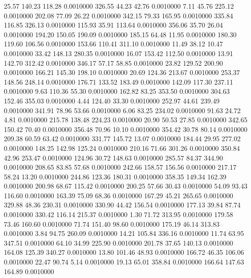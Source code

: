   25.57  140.23  118.28   0.0010000
 326.55   44.23   42.76   0.0010000
   7.11   45.76  225.12   0.0010000
 202.08   77.09   26.22   0.0010000
 342.15   79.33  165.95   0.0010000
 335.84  116.85  326.13   0.0010000
 115.93   35.91  113.64   0.0010000
 356.06   35.70   26.04   0.0010000
 194.20  150.05  190.09   0.0010000
 185.15   64.48   11.95   0.0010000
 180.30  119.60  106.56   0.0010000
 153.66  110.41  311.10   0.0010000
  11.49   38.12   10.47   0.0010000
  33.42  148.13  280.35   0.0010000
  16.07  153.42  112.50   0.0010000
  13.91  142.70  312.42   0.0010000
 346.17   57.17   58.85   0.0010000
  23.82  129.52  200.90   0.0010000
 166.21  145.30  198.10   0.0010000
  20.69  124.36  213.67   0.0010000
 253.37  148.56  248.14   0.0010000
 176.71  133.52  183.49   0.0010000
 142.09  117.30  237.11   0.0010000
   9.63  110.36   55.30   0.0010000
 162.82   83.25  353.50   0.0010000
 304.63  152.46  355.03   0.0010000
   4.44  124.40   33.30   0.0010000
 252.97   44.61  239.49   0.0010000
 341.91   78.96   53.66   0.0010000
   6.06   83.25  234.02   0.0010000
  91.63   24.72    4.81   0.0010000
 215.78  138.48  224.23   0.0010000
  20.90   50.53   27.85   0.0010000
 342.65  150.42   70.40   0.0010000
 356.48   70.96   10.10   0.0010000
 354.42   30.78   80.14   0.0010000
 209.38   60.59   63.42   0.0010000
 331.77  145.72   13.07   0.0010000
 184.44   29.95  277.02   0.0010000
 148.25  142.98  125.24   0.0010000
 210.16   71.66  301.26   0.0010000
 350.84   42.96  253.47   0.0010000
 124.96   30.72  148.63   0.0010000
 285.57   84.37  344.90   0.0010000
 208.65   83.85   57.68   0.0010000
 242.66  158.57  156.56   0.0010000
 217.17   58.24   13.20   0.0010000
 244.86  123.36  180.31   0.0010000
 358.35  149.34  162.39   0.0010000
 200.98   68.67  115.42   0.0010000
 200.25   57.66   30.43   0.0010000
  54.09   93.43  116.60   0.0010000
 163.39   75.09   68.36   0.0010000
 167.29   45.21  265.65   0.0010000
 329.88   48.36  230.31   0.0010000
 330.90   44.42  156.54   0.0010000
 177.13   39.84   87.74   0.0010000
 330.42  116.14  215.37   0.0010000
   1.30   71.72  313.95   0.0010000
 179.58   73.46  160.60   0.0010000
  71.74  151.40   98.60   0.0010000
 175.19   46.14  313.83   0.0010000
   3.84   94.75  260.09   0.0010000
  14.21  105.84  336.16   0.0010000
  11.74   63.95  347.51   0.0010000
  64.10   34.99  225.90   0.0010000
 201.78   37.65  140.13   0.0010000
 164.08  125.39  340.27   0.0010000
  13.80  101.46   48.93   0.0010000
 166.72   46.35  106.06   0.0010000
  22.47   90.74    5.14   0.0010000
  19.13   65.01  358.84   0.0010000
 166.64  147.63  164.89   0.0010000
